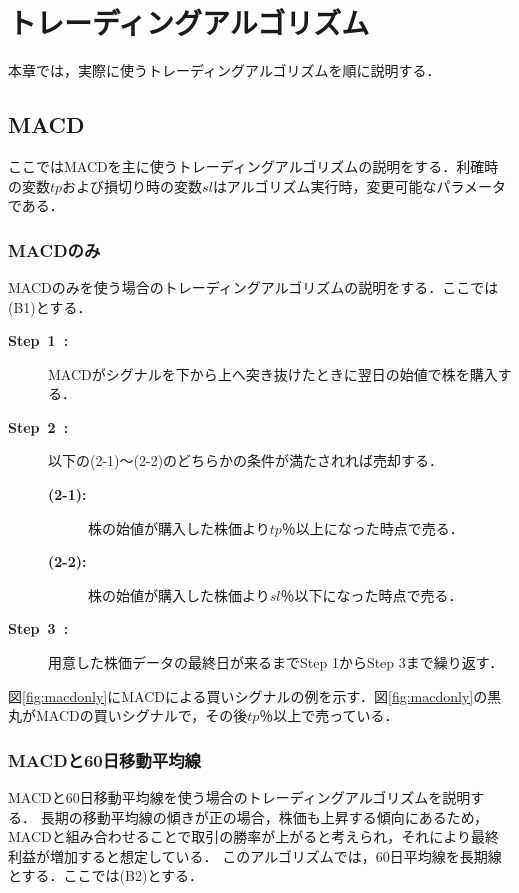 \chapter{トレーディングアルゴリズム}
本章では，実際に使うトレーディングアルゴリズムを順に説明する．
\section{MACD}
ここではMACDを主に使うトレーディングアルゴリズムの説明をする．利確時の変数$tp$および損切り時の変数$sl$はアルゴリズム実行時，変更可能なパラメータである．

\subsection{MACDのみ}
MACDのみを使う場合のトレーディングアルゴリズムの説明をする．ここでは(B1)とする．
\begin{description}
\item[\textbf{Step~1~:}]MACDがシグナルを下から上へ突き抜けたときに翌日の始値で株を購入する．

\item[\textbf{Step~2~:}]以下の(2-1)～(2-2)のどちらかの条件が満たされれば売却する．
 \begin{description}
  \item[\textbf{(2-1):}]株の始値が購入した株価より$tp$％以上になった時点で売る．
  \item[\textbf{(2-2):}]株の始値が購入した株価より$sl$％以下になった時点で売る． 
 \end{description}
\item[\textbf{Step~3~:}]用意した株価データの最終日が来るまでStep 1からStep 3まで繰り返す．
\end{description}


図\ref{fig:macdonly}にMACDによる買いシグナルの例を示す．図\ref{fig:macdonly}の黒丸がMACDの買いシグナルで，その後$tp$％以上で売っている．

\subsection{MACDと60日移動平均線}
MACDと60日移動平均線を使う場合のトレーディングアルゴリズムを説明する．
長期の移動平均線の傾きが正の場合，株価も上昇する傾向にあるため，
MACDと組み合わせることで取引の勝率が上がると考えられ，それにより最終利益が増加すると想定している．
このアルゴリズムでは，60日平均線を長期線とする．ここでは(B2)とする．

